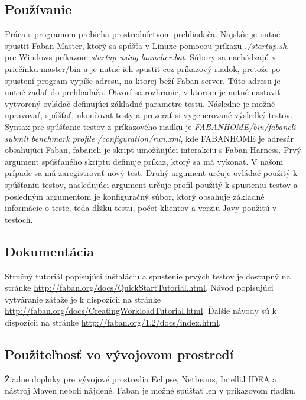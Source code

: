 \documentclass[12pt,oneside,final]{fithesis-utf8}
\newcommand\underscore[1]{\underline{\hspace{8pt}}}
\begin{document}
\subsection{Používanie}
Práca s programom prebieha prostredníctvom prehliadača. Najskôr je nutné spustiť Faban Master, ktorý sa spúšťa v Linuxe pomocou príkazu \textit{./startup.sh}, pre Windows príkazom \textit{startup-using-launcher.bat}. Súbory sa nachádzajú v priečinku master/bin a je nutné ich spustiť cez príkazový riadok, pretože po spustení program vypíše adresu, na ktorej beží Faban server. Túto adresu je nutné zadať do prehliadača. Otvorí sa rozhranie, v ktorom je nutné nastaviť vytvorený ovládač definujúci základné parametre testu. Následne je možné upravovať, spúšťať, ukončovať testy a prezerať si vygenerované výsledký testov. Syntax pre spúšťanie testov z príkazového riadku je \textit{FABAN\underscore{}HOME/bin/fabancli submit benchmark profile /configuration/run.xml}, kde FABAN\underscore{}HOME je adresár obsahujúci Faban, fabancli je skript umožňujúci interakciu s Faban Harness. Prvý argument spúšťaného skriptu definuje príkaz, ktorý sa má vykonať. V našom prípade sa má zaregistrovať nový test. Druhý argument určuje ovládač použitý k spúšťaniu testov, nasledujúci argument určuje profil použitý k spusteniu testov a posledným argumentom je konfiguračný súbor, ktorý obsahuje základné informácie o teste, teda dĺžku testu, počet klientov a verziu Javy použitú v testoch.

\subsection{Dokumentácia}
Stručný tutoriál popisujúci inštaláciu a spustenie prvých testov je dostupný na stránke \url{http://faban.org/docs/QuickStartTutorial.html}. Návod popisujúci vytváranie záťaže je k dispozícii na stránke \url{http://faban.org/docs/CreatingWorkloadTutorial.html}. Ďalšie návody sú k dispozícii na stránke \url{http://faban.org/1.2/docs/index.html}.

\subsection{Použiteľnosť vo vývojovom prostredí}
Žiadne doplnky pre vývojové prostredia Eclipse, Netbeans, IntelliJ IDEA a nástroj Maven neboli nájdené. Faban je možné spúšťať len v príkazovom riadku.



\newpage
\end{document}
